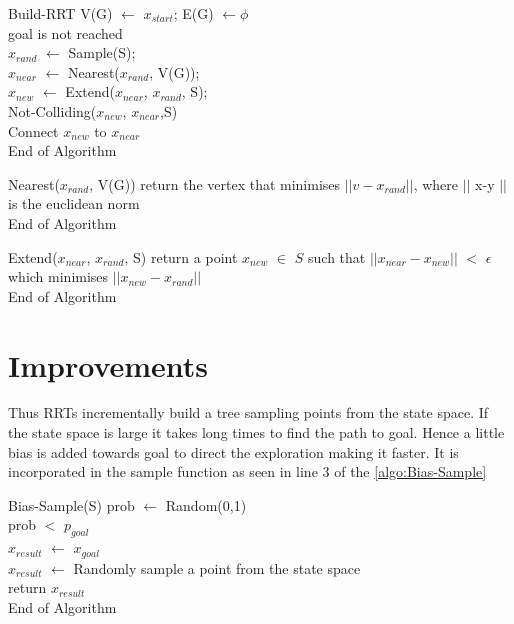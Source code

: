 \documentclass[MTech]{iitmdiss}
\begin{document}
\begin{algorithm}{Build-RRT}{
\label{algo:Build-RRT}
}
 V(G) $\leftarrow$ {$x_{start}$};  E(G) $\leftarrow${$\phi$ } \\
\qwhile goal is not reached \\
$x_{rand}$ $\leftarrow$ Sample(S);\\
$x_{near}$ $\leftarrow$ Nearest($x_{rand}$, V(G));\\
$x_{new}$ $\leftarrow$ Extend($x_{near}$, $x_{rand}$, S);\\
\qif Not-Colliding($x_{new}$, $x_{near}$,S)\\
\qthen Connect $x_{new}$ to $x_{near}$\qfi \qend\\
End of Algorithm
\end{algorithm}

\begin{algorithm}{Nearest($x_{rand}$, V(G))}{
\label{algo:Nearest}
}
return the vertex that minimises $||v - x_{rand} ||$, where $||$ x-y  $||$ is the euclidean norm\\
End of Algorithm
\end{algorithm}

\begin{algorithm}{Extend($x_{near}$, $x_{rand}$, S)}{
\label{algo:Extend}
}
return a point $x_{new}$ $\in$ $S$ such that $||x_{near} - x_{new} ||$ $<$ $\epsilon$ which minimises $||x_{new} - x_{rand} ||$ \\
End of Algorithm
\end{algorithm}

\section{Improvements}
Thus RRTs incrementally build a tree sampling points from the state space. If the state space is large it takes long times to find the path to goal. Hence a little bias is added towards goal to direct the exploration making it faster. It is incorporated in the sample function as seen in line 3 of the \ref{algo:Bias-Sample}

\begin{algorithm}{Bias-Sample(S)}{
\label{algo:Bias-Sample}
}
prob $\leftarrow$ Random(0,1)\\
\qif prob $<$ $p_{goal}$\\
\qthen $x_{result}$ $\leftarrow$ $x_{goal}$\\
\qelse $x_{result}$ $\leftarrow$ Randomly sample a point from the state space \qfi\\
return $x_{result}$\\
End of Algorithm
\end{algorithm}
\end{document}
